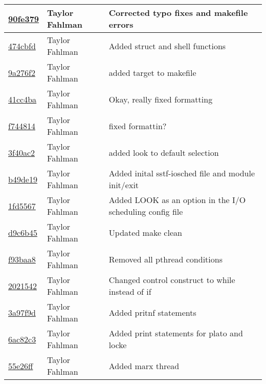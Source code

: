 \begin{tabular}{l l l}
\href{git@github.com:fahlmant/cs444/commit/90fe379dcec284aec20892a7b5dfed7418d1f629}{90fe379} & Taylor Fahlman & Corrected typo fixes and makefile errors\\\hline
\href{git@github.com:fahlmant/cs444/commit/474cbfd6cf240364ec4739b91d21f0a08efa0507}{474cbfd} & Taylor Fahlman & Added struct and shell functions\\\hline
\href{git@github.com:fahlmant/cs444/commit/9a276f27141dec3a008c5ff9b3f53302579d55dc}{9a276f2} & Taylor Fahlman & added target to makefile\\\hline
\href{git@github.com:fahlmant/cs444/commit/41cc4baab6306e573e7cebb13ab23eba9ee28942}{41cc4ba} & Taylor Fahlman & Okay, really fixed formatting\\\hline
\href{git@github.com:fahlmant/cs444/commit/f744814a5f73441d92f08e7ec4c1734b8effe233}{f744814} & Taylor Fahlman & fixed formattin?\\\hline
\href{git@github.com:fahlmant/cs444/commit/3f40ac2f576b2250e924524e3c7973a7b57b99dc}{3f40ac2} & Taylor Fahlman & added look to default selection\\\hline
\href{git@github.com:fahlmant/cs444/commit/b49de190dda284a50bb2738f40b8436171b9d691}{b49de19} & Taylor Fahlman & Added inital sstf-iosched file and module init/exit\\\hline
\href{git@github.com:fahlmant/cs444/commit/1fd55679562034d28fcfbb6e2ac1642c5c88dfc9}{1fd5567} & Taylor Fahlman & Added LOOK as an option in the I/O scheduling config file\\\hline
\href{git@github.com:fahlmant/cs444/commit/d9c6b45e2f1eee4649ad42b115e750bd68d2622a}{d9c6b45} & Taylor Fahlman & Updated make clean\\\hline
\href{git@github.com:fahlmant/cs444/commit/f93baa8e24785744b1f3ae51ec64e45e62e6ea6e}{f93baa8} & Taylor Fahlman & Removed all pthread conditions\\\hline
\href{git@github.com:fahlmant/cs444/commit/2021542aebdf6ed1edee48fec117909c7b9926da}{2021542} & Taylor Fahlman & Changed control construct to while instead of if\\\hline
\href{git@github.com:fahlmant/cs444/commit/3a97f9ddf3e62cf13f868b6554fa48b76e200e64}{3a97f9d} & Taylor Fahlman & Added pritnf statements\\\hline
\href{git@github.com:fahlmant/cs444/commit/6ac82c37f00e5ac3d70cc9fce0cdd69a4b09a1c0}{6ac82c3} & Taylor Fahlman & Added print statements for plato and locke\\\hline
\href{git@github.com:fahlmant/cs444/commit/55e26ff34cc7fc3159c10da1add5024754667dbd}{55e26ff} & Taylor Fahlman & Added marx thread\\\hline

\end{tabular}
